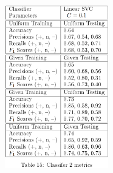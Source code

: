 \documentclass[11pt]{article}
\begin{document}
\begin{figure}[H]
	\centering
	\includegraphics[width = 0.4\textwidth]{c2m.png}
	\label{tbl:metrics-2nd10000}
\end{figure} 




\end{document}
